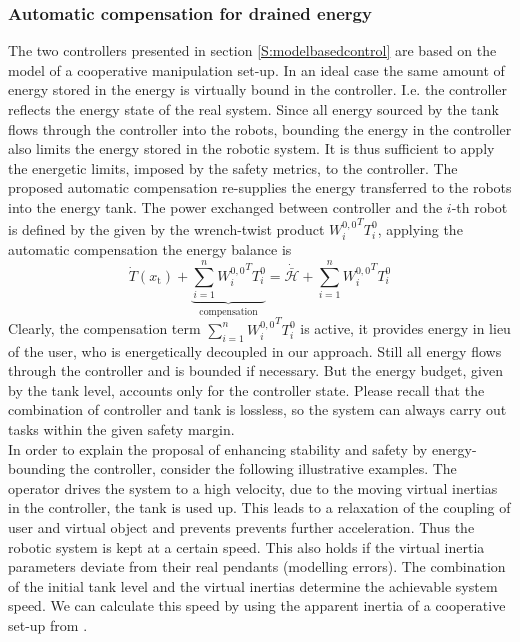 \documentclass[a4paper,twoside, openright,12pt]{report}
\newcommand{\g}[1]{\text{#1}}
\begin{document}
{\subsubsection{Automatic compensation for drained energy}
The two controllers presented in section \ref{S:modelbasedcontrol} are based on the model of a cooperative manipulation set-up. In an ideal case the same amount of energy stored in the energy is virtually bound in the controller. I.e. the controller reflects the energy state of the real system. Since all energy sourced by the tank flows through the controller into the robots, bounding the energy in the controller also limits the energy stored in the robotic system.
It is thus sufficient to apply the energetic limits, imposed by the safety metrics, to the controller. The proposed automatic compensation re-supplies the energy transferred to the robots into the energy tank. 
The power exchanged between controller and the $i$-th robot is defined by the given by the wrench-twist product ${W_i^{0,0}}^T T_i^0$, applying the automatic compensation the energy balance is
\begin{equation}
\dot{T}(x_\g{t}) + \underbrace{\sum_{i=1}^n {W_i^{0,0}}^T T_i^0}_{\text{compensation}} = \dot{\bar{\mathcal{H}}} + \sum_{i=1}^n {W_i^{0,0}}^T T_i^0
\end{equation}
Clearly, the compensation term $\sum_{i=1}^n {W_i^{0,0}}^T T_i^0$ is active, it provides energy in lieu of the user, who is energetically decoupled in our approach. Still all energy flows through the controller and is bounded if necessary. But the energy budget, given by the tank level, accounts only for the controller state. Please recall that the combination of controller and tank is lossless, so the system can always carry out tasks within the given safety margin.\\ 
In order to explain the proposal of enhancing stability and safety by energy-bounding the controller, consider the following illustrative examples.
The operator drives the system to a high velocity, due to the moving virtual inertias in the controller, the tank is used up. This leads to a relaxation of the coupling of user and virtual object and prevents prevents further acceleration. Thus the robotic system is kept at a certain speed. This also holds if the virtual inertia parameters deviate from their real pendants (modelling errors). The combination of the initial tank level and the virtual inertias determine the achievable system speed. We can calculate this speed by using the apparent inertia of a cooperative set-up from \cite{Erhart_16}.\\ 
}
\end{document}
